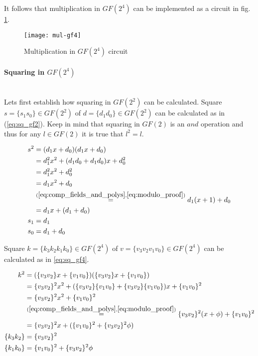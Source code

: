 It follows that multiplication in $GF(2^4)$ can be implemented as a circuit in fig. \ref{fig:mul_gf4}.

\begin{figure}[!h]
\centering
\texttt{[image: mul-gf4]}
\caption{Multiplication in $GF(2^4)$ circuit}
\label{fig:mul_gf4}
\end{figure}


\paragraph{Squaring in $GF(2^4)$}\mbox{}\\
Lets first establish how squaring in $GF(2^2)$ can be calculated. 
Square $s = \{s_1s_0\} \in GF(2^2)$ of $d = \{d_1d_0\} \in GF(2^2)$ can be calculated as in (\ref{eq:sq_gf2}). Keep in mind that squaring in $GF(2)$ is an $and$ operation and thus for any $l \in GF(2)$ it is true that $l^2 = l$.

\begin{equation}
\label{eq:sq_gf2}
\begin{aligned}
s^2 &= (d_1x + d_0)(d_1x + d_0) \\
&= d_1^2x^2 + (d_1d_0 + d_1d_0)x + d_0^2 \\
&= d_1^2x^2 + d_0^2 \\
&= d_1x^2 + d_0\\
&\stackrel{(\ref{eq:comp_fields_and_polys}, \ref{eq:modulo_proof})}{=}
d_1(x + 1) + d_0 \\
&= d_1x + (d_1 + d_0)\\
s_1 &= d_1\\
s_0 &= d_1 + d_0
\end{aligned}
\end{equation}

Square $k = \{k_3k_2k_1k_0\} \in GF(2^4)$ of $v = \{v_3v_2v_1v_0\} \in GF(2^4)$ can be calculated as in \ref{eq:sq_gf4}.

\begin{equation}
\label{eq:sq_gf4}
\begin{aligned}
k^2 &= (\{v_3v_2\}x + \{v_1v_0\})(\{v_3v_2\}x + \{v_1v_0\})\\
&= \{v_3v_2\}^2x^2 + (\{v_3v_2\}\{v_1v_0\} + \{v_3v_2\}\{v_1v_0\})x + \{v_1v_0\}^2 \\
&= \{v_3v_2\}^2x^2 + \{v_1v_0\}^2 \\
&\stackrel{(\ref{eq:comp_fields_and_polys}, \ref{eq:modulo_proof})}{=}
\{v_3v_2\}^2(x + \phi) + \{v_1v_0\}^2 \\
&= \{v_3v_2\}^2x + (\{v_1v_0\}^2 + \{v_3v_2\}^2\phi)\\
\{k_3k_2\} &= \{v_3v_2\}^2 \\
\{k_1k_0\} &= \{v_1v_0\}^2 + \{v_3v_2\}^2\phi
\end{aligned}
\end{equation}

